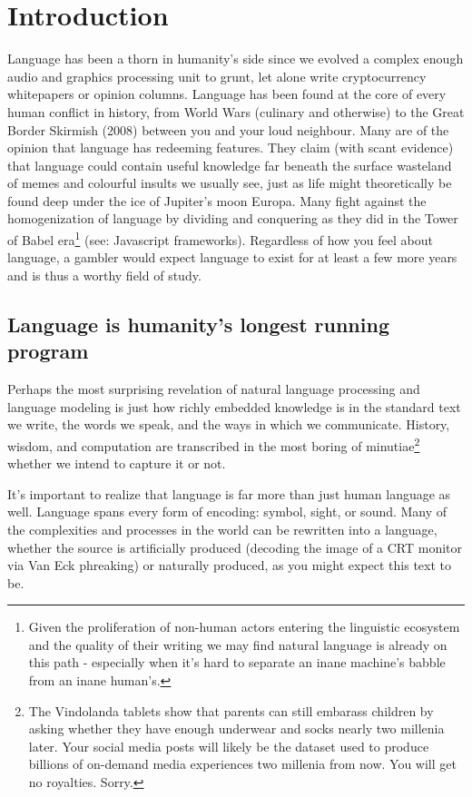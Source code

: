 \documentclass{article}
\begin{document}
\section{Introduction}

Language has been a thorn in humanity's side since we evolved a complex enough audio and graphics processing unit to grunt, let alone write cryptocurrency whitepapers or opinion columns.
Language has been found at the core of every human conflict in history, from World Wars (culinary and otherwise) to the Great Border Skirmish (2008) between you and your loud neighbour.
Many are of the opinion that language has redeeming features.
They claim (with scant evidence) that language could contain useful knowledge far beneath the surface wasteland of memes and colourful insults we usually see, just as life might theoretically be found deep under the ice of Jupiter's moon Europa.
Many fight against the homogenization of language by dividing and conquering as they did in the Tower of Babel era\footnote{Given the proliferation of non-human actors entering the linguistic ecosystem and the quality of their writing we may find natural language is already on this path - especially when it's hard to separate an inane machine's babble from an inane human's.} (see: Javascript frameworks).
Regardless of how you feel about language, a gambler would expect language to exist for at least a few more years and is thus a worthy field of study.

\subsection{Language is humanity's longest running program}

Perhaps the most surprising revelation of natural language processing and language modeling is just how richly embedded knowledge is in the standard text we write, the words we speak, and the ways in which we communicate.
History, wisdom, and computation are transcribed in the most boring of minutiae\footnote{The Vindolanda tablets show that parents can still embarass children by asking whether they have enough underwear and socks nearly two millenia later. Your social media posts will likely be the dataset used to produce billions of on-demand media experiences two millenia from now. You will get no royalties. Sorry.} whether we intend to capture it or not.

It's important to realize that language is far more than just human language as well.
Language spans every form of encoding: symbol, sight, or sound.
Many of the complexities and processes in the world can be rewritten into a language, whether the source is artificially produced (decoding the image of a CRT monitor via Van Eck phreaking) or naturally produced, as you might expect this text to be.
\end{document}
